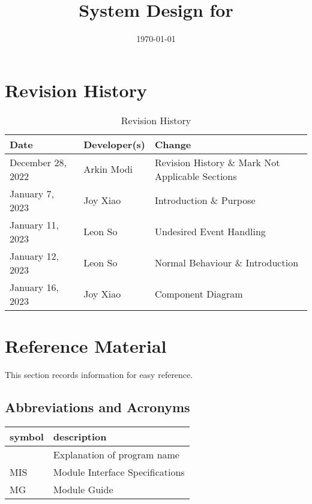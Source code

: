 \documentclass[12pt, titlepage]{article}
\begin{document}
\title{System Design for \progname{}}
\author{\authname}
\date{\today}

\maketitle


\section{Revision History}

\begin{table}[hp]
	\caption{Revision History} \label{TblRevisionHistory}
	\begin{tabularx}{\textwidth}{llX}
		\toprule
		\textbf{Date}     & \textbf{Developer(s)} & \textbf{Change}                                  \\
		\midrule
		December 28, 2022 & Arkin Modi            & Revision History \& Mark Not Applicable Sections \\
		January 7, 2023   & Joy Xiao              & Introduction \& Purpose                          \\
		January 11, 2023  & Leon So               & Undesired Event Handling                         \\
		January 12, 2023  & Leon So               & Normal Behaviour \& Introduction                 \\
		January 16, 2023  & Joy Xiao              & Component Diagram                                \\
		\bottomrule
	\end{tabularx}
\end{table}

\newpage

\section{Reference Material}

This section records information for easy reference.

\subsection{Abbreviations and Acronyms}

\begin{tabular}{l l}
	\toprule
	\textbf{symbol} & \textbf{description}            \\
	\midrule
	\progname       & Explanation of program name     \\
	MIS             & Module Interface Specifications \\
	MG              & Module Guide                    \\
	\bottomrule
\end{tabular}
\end{document}
